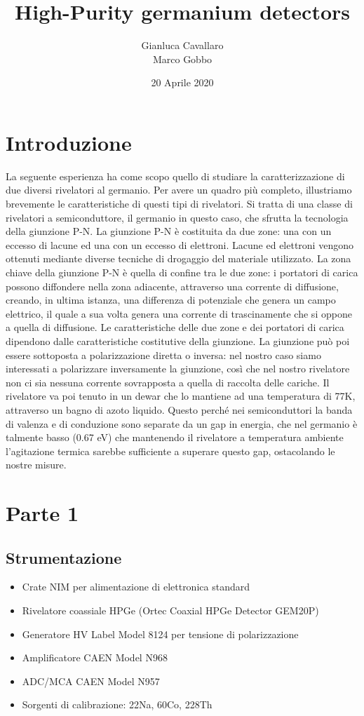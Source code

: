 \documentclass[a4paper,10pt]{article}
\title{High-Purity germanium detectors}
\author{Gianluca Cavallaro \\ Marco Gobbo}
\date{20 Aprile 2020}
\begin{document}
\maketitle


\section{Introduzione}
La seguente esperienza ha come scopo quello di studiare la caratterizzazione di due diversi rivelatori al germanio. Per avere un quadro pi\`u completo, illustriamo brevemente le caratteristiche di questi tipi di rivelatori. Si tratta di una classe di rivelatori a semiconduttore, il germanio in questo caso, che sfrutta la tecnologia della giunzione P-N. La giunzione P-N \`e costituita da due zone: una con un eccesso di lacune ed una con un eccesso di elettroni. Lacune ed elettroni vengono ottenuti mediante diverse tecniche di drogaggio del materiale utilizzato. La zona chiave della giunzione P-N \`e quella di confine tra le due zone: i portatori di carica possono diffondere nella zona adiacente, attraverso una corrente di diffusione, creando, in ultima istanza, una differenza di potenziale che genera un campo elettrico, il quale a sua volta genera una corrente di trascinamente che si oppone a quella di diffusione. Le caratteristiche delle due zone e dei portatori di carica dipendono dalle caratteristiche costitutive della giunzione. La giunzione pu\`o poi essere sottoposta a polarizzazione diretta o inversa: nel nostro caso siamo interessati a polarizzare inversamente la giunzione, cos\`i che nel nostro rivelatore non ci sia nessuna corrente sovrapposta a quella di raccolta delle cariche. Il rivelatore va poi tenuto in un dewar che lo mantiene ad una temperatura di 77K, attraverso un bagno di azoto liquido. Questo perch\'e nei semiconduttori la banda di valenza e di conduzione sono separate da un gap in energia, che nel germanio \`e talmente basso (0.67 eV) che mantenendo il rivelatore a temperatura ambiente l'agitazione termica sarebbe sufficiente a superare questo gap, ostacolando le nostre misure.
\section{Parte 1}


\subsection{Strumentazione}
\begin{itemize}
\item Crate NIM per alimentazione di elettronica standard
\item Rivelatore coassiale HPGe (Ortec Coaxial HPGe Detector GEM20P)
\item Generatore HV Label Model 8124 per tensione di polarizzazione
\item Amplificatore CAEN Model N968
\item ADC/MCA CAEN Model N957
\item Sorgenti di calibrazione: 22Na, 60Co, 228Th
\end{itemize}
\end{document}
